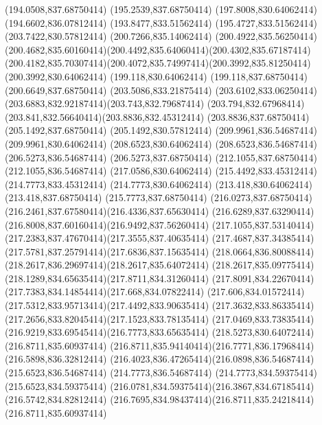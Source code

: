 {{	\lineto(194.0508,837.68750414)
	\lineto(195.2539,837.68750414)
	\lineto(197.8008,830.64062414)
	\closepath
	\moveto(194.6602,836.07812414)
	\lineto(193.8477,833.51562414)
	\lineto(195.4727,833.51562414)
	\closepath
	\moveto(203.7422,830.57812414)
	\lineto(200.7266,835.14062414)
	\lineto(200.4922,835.56250414)
	\curveto(200.4682,835.60160414)(200.4492,835.64060414)(200.4302,835.67187414)
	\curveto(200.4182,835.70307414)(200.4072,835.74997414)(200.3992,835.81250414)
	\lineto(200.3992,830.64062414)
	\lineto(199.118,830.64062414)
	\lineto(199.118,837.68750414)
	\lineto(200.6649,837.68750414)
	\lineto(203.5086,833.21875414)
	\curveto(203.6102,833.06250414)(203.6883,832.92187414)(203.743,832.79687414)
	\curveto(203.794,832.67968414)(203.841,832.56640414)(203.8836,832.45312414)
	\lineto(203.8836,837.68750414)
	\lineto(205.1492,837.68750414)
	\lineto(205.1492,830.57812414)
	\closepath
	\moveto(209.9961,836.54687414)
	\lineto(209.9961,830.64062414)
	\lineto(208.6523,830.64062414)
	\lineto(208.6523,836.54687414)
	\lineto(206.5273,836.54687414)
	\lineto(206.5273,837.68750414)
	\lineto(212.1055,837.68750414)
	\lineto(212.1055,836.54687414)
	\closepath
	\moveto(217.0586,830.64062414)
	\lineto(215.4492,833.45312414)
	\lineto(214.7773,833.45312414)
	\lineto(214.7773,830.64062414)
	\lineto(213.418,830.64062414)
	\lineto(213.418,837.68750414)
	\lineto(215.7773,837.68750414)
	\curveto(216.0273,837.68750414)(216.2461,837.67580414)(216.4336,837.65630414)
	\curveto(216.6289,837.63290414)(216.8008,837.60160414)(216.9492,837.56260414)
	\curveto(217.1055,837.53140414)(217.2383,837.47670414)(217.3555,837.40635414)
	\curveto(217.4687,837.34385414)(217.5781,837.25791414)(217.6836,837.15635414)
	\curveto(218.0664,836.80088414)(218.2617,836.29697414)(218.2617,835.64072414)
	\curveto(218.2617,835.09775414)(218.1289,834.65635414)(217.8711,834.31260414)
	\curveto(217.8091,834.22670414)(217.7383,834.14854414)(217.668,834.07822414)
	\curveto(217.606,834.01572414)(217.5312,833.95713414)(217.4492,833.90635414)
	\curveto(217.3632,833.86335414)(217.2656,833.82045414)(217.1523,833.78135414)
	\curveto(217.0469,833.73835414)(216.9219,833.69545414)(216.7773,833.65635414)
	\lineto(218.5273,830.64072414)
	\closepath
	\moveto(216.8711,835.60937414)
	\curveto(216.8711,835.94140414)(216.7771,836.17968414)(216.5898,836.32812414)
	\curveto(216.4023,836.47265414)(216.0898,836.54687414)(215.6523,836.54687414)
	\lineto(214.7773,836.54687414)
	\lineto(214.7773,834.59375414)
	\lineto(215.6523,834.59375414)
	\curveto(216.0781,834.59375414)(216.3867,834.67185414)(216.5742,834.82812414)
	\curveto(216.7695,834.98437414)(216.8711,835.24218414)(216.8711,835.60937414)
}}
